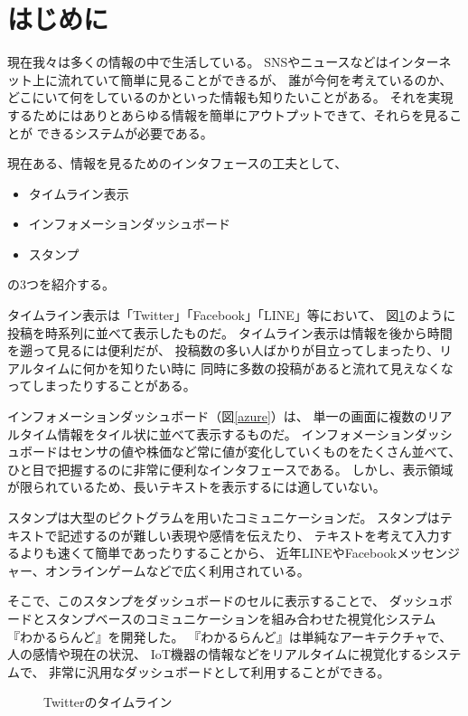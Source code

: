 \section{はじめに}
現在我々は多くの情報の中で生活している。
SNSやニュースなどはインターネット上に流れていて簡単に見ることができるが、
誰が今何を考えているのか、どこにいて何をしているのかといった情報も知りたいことがある。
それを実現するためにはありとあらゆる情報を簡単にアウトプットできて、それらを見ることが
できるシステムが必要である。

現在ある、情報を見るためのインタフェースの工夫として、
\begin{itemize}
\item タイムライン表示
\item インフォメーションダッシュボード
\item スタンプ
\end{itemize}
の3つを紹介する。

タイムライン表示は「Twitter」「Facebook」「LINE」等において、
図\ref{twitter}のように投稿を時系列に並べて表示したものだ。
タイムライン表示は情報を後から時間を遡って見るには便利だが、
投稿数の多い人ばかりが目立ってしまったり、リアルタイムに何かを知りたい時に
同時に多数の投稿があると流れて見えなくなってしまったりすることがある。

インフォメーションダッシュボード（図\ref{azure}）は、
単一の画面に複数のリアルタイム情報をタイル状に並べて表示するものだ。
インフォメーションダッシュボードはセンサの値や株価など常に値が変化していくものをたくさん並べて、
ひと目で把握するのに非常に便利なインタフェースである。
しかし、表示領域が限られているため、長いテキストを表示するには適していない。

スタンプは大型のピクトグラムを用いたコミュニケーションだ。
スタンプはテキストで記述するのが難しい表現や感情を伝えたり、
テキストを考えて入力するよりも速くて簡単であったりすることから、
近年LINEやFacebookメッセンジャー、オンラインゲームなどで広く利用されている。

そこで、このスタンプをダッシュボードのセルに表示することで、
ダッシュボードとスタンプベースのコミュニケーションを組み合わせた視覚化システム
『わかるらんど』を開発した。
『わかるらんど』は単純なアーキテクチャで、人の感情や現在の状況、
IoT機器の情報などをリアルタイムに視覚化するシステムで、
非常に汎用なダッシュボードとして利用することができる。

\begin{figure}[h]
\centering
{}
\caption{Twitterのタイムライン}
\label{twitter}
\end{figure}



